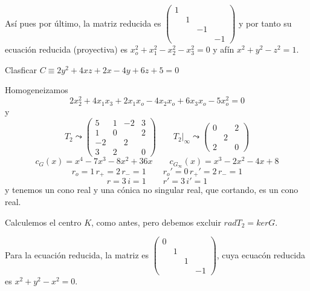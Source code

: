 \begin{sol}
    As\'i pues por \'ultimo, la matriz reducida es $\left(\begin{smallmatrix}
        1 \\ & 1 \\ & & -1 \\ & & & -1
    \end{smallmatrix} \right)$ y por tanto su ecuaci\'on reducida (proyectiva) es $x_o^2 + x_1^2 - x_2^2 -x_3^2=0$ y af\'in $x^2+y^2-z^2=1$.
\end{sol}
\begin{ejer}
    Clasficar $C\equiv 2y^2+4xz+2x-4y+6z+5=0$
\end{ejer}
\begin{sol}
    Homogeneizamos
    $$2x_2^2 + 4x_1x_3+2x_1x_o-4x_2x_o+6x_3x_o-5x_o^2 = 0$$
    y 
    $$T_2 \leadsto \begin{pmatrix}
        5 & 1 & -2 & 3 \\ 1 & 0 & & 2 \\ -2 & & 2 &  \\ 3 & 2 & & 0  
    \end{pmatrix} \qquad T_2|_{\infty} \leadsto \begin{pmatrix}
       0 & & 2 \\  & 2 &  \\  2 & & 0  
    \end{pmatrix}$$
    $$c_G(x)=x^4-7x^3-8x^2+36x \qquad c_{G_{\infty}}(x) = x^3-2x^2-4x+8$$
    $$r_o=1 \, r_+=2 \, r_-=1 \qquad r_o'=0 \, r_+'=2 \, r_-=1$$
    $$r=3 \, i=1 \qquad r'=3 \, i'=1$$
    y tenemos un cono real y una c\'onica no singular real, que cortando, es un cono real.

    Calculemos el centro $K$, como antes, pero debemos excluir $rad T_2 = ker G$.

    Para la ecuaci\'on reducida, la matriz es $\left(\begin{smallmatrix}
        0 \\ & 1 \\ & & 1 \\ & & & -1
    \end{smallmatrix} \right)$, cuya ecuac\'on reducida es $x^2+y^2-x^2=0$.
\end{sol}
\newpage 


